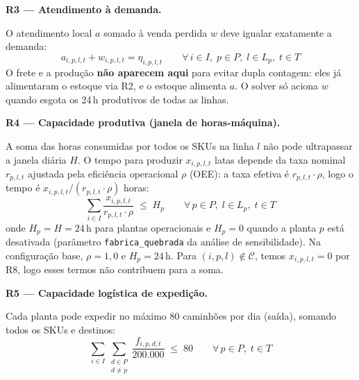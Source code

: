 \documentclass[12pt, a4paper]{article}
\begin{document}
\vspace{8pt}

\begin{mdframed}[style=destaque]
\textbf{\color{ballblue}R3 --- Atendimento \`{a} demanda.}
\medskip

O atendimento local $a$ somado \`{a} venda perdida $w$ deve igualar exatamente a demanda:
\[
  a_{i,p,l,t} + w_{i,p,l,t} = \eta_{i,p,l,t}
  \qquad \forall\, i \in I,\; p \in P,\; l \in L_p,\; t \in T
\]
O frete e a produ\c{c}\~{a}o \textbf{n\~{a}o aparecem aqui} para evitar dupla contagem:
eles j\'{a} alimentaram o estoque via R2, e o estoque alimenta $a$.
O solver s\'{o} aciona $w$ quando esgota os 24\,h produtivos de todas as linhas.
\end{mdframed}

\vspace{8pt}

\begin{mdframed}[style=destaque]
\textbf{\color{ballblue}R4 --- Capacidade produtiva (janela de horas-m\'{a}quina).}
\medskip

A soma das horas consumidas por todos os SKUs na linha $l$ n\~{a}o pode ultrapassar a
janela di\'{a}ria $H$. O tempo para produzir $x_{i,p,l,t}$ latas depende da taxa nominal
$r_{p,l,t}$ ajustada pela efici\^{e}ncia operacional $\rho$ (OEE): a taxa efetiva \'{e}
$r_{p,l,t}\cdot\rho$, logo o tempo \'{e} $x_{i,p,l,t} / (r_{p,l,t}\cdot\rho)$ horas:
\[
  \sum_{i \in I} \frac{x_{i,p,l,t}}{r_{p,l,t}\cdot\rho} \;\leq\; H_{p}
  \qquad \forall\, p \in P,\; l \in L_p,\; t \in T
\]
onde $H_{p} = H = 24$\,h para plantas operacionais e $H_{p} = 0$ quando a planta $p$
est\'{a} desativada (par\^{a}metro \texttt{fabrica\_quebrada} da an\'{a}lise de
sensibilidade). Na configura\c{c}\~{a}o base, $\rho = 1{,}0$ e $H_{p} = 24$\,h.
Para $(i,p,l) \notin \mathcal{C}$, temos $x_{i,p,l,t} = 0$ por R8, logo esses
termos n\~{a}o contribuem para a soma.
\end{mdframed}

\vspace{8pt}

\begin{mdframed}[style=destaque]
\textbf{\color{ballblue}R5 --- Capacidade log\'{i}stica de expedi\c{c}\~{a}o.}
\medskip

Cada planta pode expedir no m\'{a}ximo 80 caminh\~{o}es por dia (sa\'{i}da),
somando todos os SKUs e destinos:
\[
  \sum_{i \in I} \sum_{\substack{d \in P \\ d \neq p}}
  \frac{f_{i,p,d,t}}{200{.}000} \;\leq\; 80
  \qquad \forall\, p \in P,\; t \in T
\]
\end{mdframed}
\end{document}
